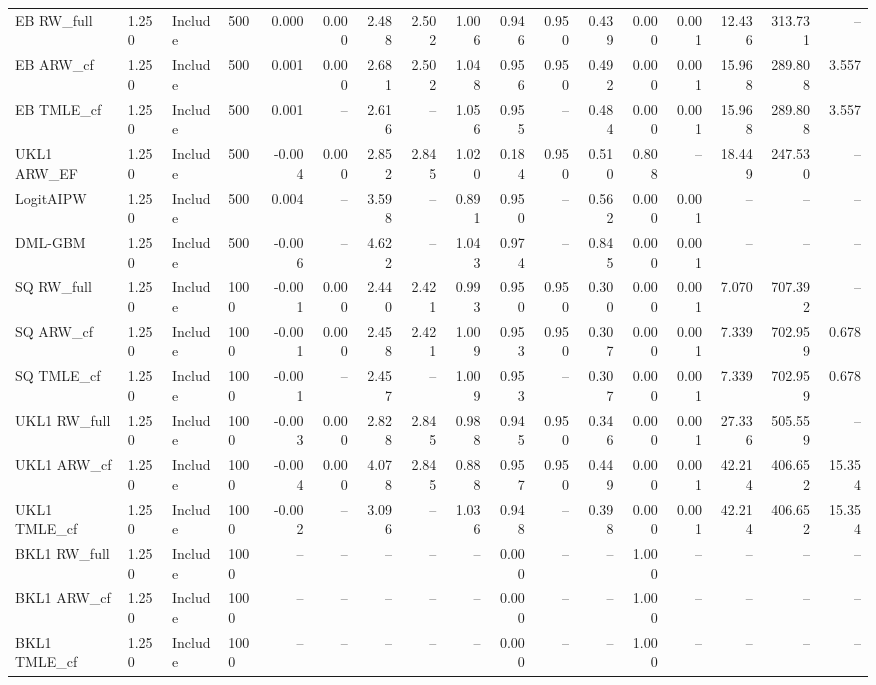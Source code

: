 \begin{tabular}{llllrrrrrrrrrrrrr}
EB RW\_full & 1.250 & Include & 500 & 0.000 & 0.000 & 2.488 & 2.502 & 1.006 & 0.946 & 0.950 & 0.439 & 0.000 & 0.001 & 12.436 & 313.731 & -- \\
EB ARW\_cf & 1.250 & Include & 500 & 0.001 & 0.000 & 2.681 & 2.502 & 1.048 & 0.956 & 0.950 & 0.492 & 0.000 & 0.001 & 15.968 & 289.808 & 3.557 \\
EB TMLE\_cf & 1.250 & Include & 500 & 0.001 & -- & 2.616 & -- & 1.056 & 0.955 & -- & 0.484 & 0.000 & 0.001 & 15.968 & 289.808 & 3.557 \\
UKL1 ARW\_EF & 1.250 & Include & 500 & -0.004 & 0.000 & 2.852 & 2.845 & 1.020 & 0.184 & 0.950 & 0.510 & 0.808 & -- & 18.449 & 247.530 & -- \\
LogitAIPW & 1.250 & Include & 500 & 0.004 & -- & 3.598 & -- & 0.891 & 0.950 & -- & 0.562 & 0.000 & 0.001 & -- & -- & -- \\
DML-GBM & 1.250 & Include & 500 & -0.006 & -- & 4.622 & -- & 1.043 & 0.974 & -- & 0.845 & 0.000 & 0.001 & -- & -- & -- \\
SQ RW\_full & 1.250 & Include & 1000 & -0.001 & 0.000 & 2.440 & 2.421 & 0.993 & 0.950 & 0.950 & 0.300 & 0.000 & 0.001 & 7.070 & 707.392 & -- \\
SQ ARW\_cf & 1.250 & Include & 1000 & -0.001 & 0.000 & 2.458 & 2.421 & 1.009 & 0.953 & 0.950 & 0.307 & 0.000 & 0.001 & 7.339 & 702.959 & 0.678 \\
SQ TMLE\_cf & 1.250 & Include & 1000 & -0.001 & -- & 2.457 & -- & 1.009 & 0.953 & -- & 0.307 & 0.000 & 0.001 & 7.339 & 702.959 & 0.678 \\
UKL1 RW\_full & 1.250 & Include & 1000 & -0.003 & 0.000 & 2.828 & 2.845 & 0.988 & 0.945 & 0.950 & 0.346 & 0.000 & 0.001 & 27.336 & 505.559 & -- \\
UKL1 ARW\_cf & 1.250 & Include & 1000 & -0.004 & 0.000 & 4.078 & 2.845 & 0.888 & 0.957 & 0.950 & 0.449 & 0.000 & 0.001 & 42.214 & 406.652 & 15.354 \\
UKL1 TMLE\_cf & 1.250 & Include & 1000 & -0.002 & -- & 3.096 & -- & 1.036 & 0.948 & -- & 0.398 & 0.000 & 0.001 & 42.214 & 406.652 & 15.354 \\
BKL1 RW\_full & 1.250 & Include & 1000 & -- & -- & -- & -- & -- & 0.000 & -- & -- & 1.000 & -- & -- & -- & -- \\
BKL1 ARW\_cf & 1.250 & Include & 1000 & -- & -- & -- & -- & -- & 0.000 & -- & -- & 1.000 & -- & -- & -- & -- \\
BKL1 TMLE\_cf & 1.250 & Include & 1000 & -- & -- & -- & -- & -- & 0.000 & -- & -- & 1.000 & -- & -- & -- & -- \\

\end{tabular}
